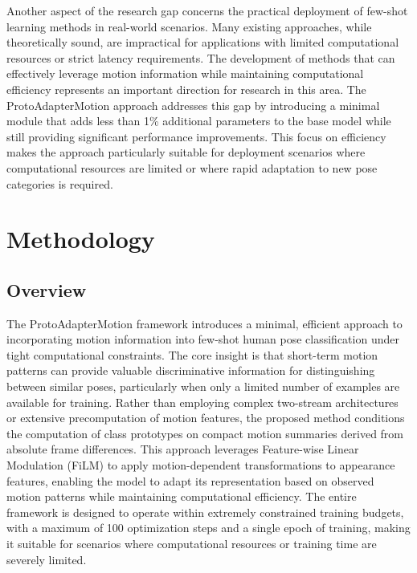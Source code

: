 \documentclass[11pt]{article}
\begin{document}
Another aspect of the research gap concerns the practical deployment of few-shot learning methods in real-world scenarios. Many existing approaches, while theoretically sound, are impractical for applications with limited computational resources or strict latency requirements. The development of methods that can effectively leverage motion information while maintaining computational efficiency represents an important direction for research in this area. The ProtoAdapterMotion approach addresses this gap by introducing a minimal module that adds less than 1\% additional parameters to the base model while still providing significant performance improvements. This focus on efficiency makes the approach particularly suitable for deployment scenarios where computational resources are limited or where rapid adaptation to new pose categories is required.

\section{Methodology}

\subsection{Overview}

The ProtoAdapterMotion framework introduces a minimal, efficient approach to incorporating motion information into few-shot human pose classification under tight computational constraints. The core insight is that short-term motion patterns can provide valuable discriminative information for distinguishing between similar poses, particularly when only a limited number of examples are available for training. Rather than employing complex two-stream architectures or extensive precomputation of motion features, the proposed method conditions the computation of class prototypes on compact motion summaries derived from absolute frame differences. This approach leverages Feature-wise Linear Modulation (FiLM) to apply motion-dependent transformations to appearance features, enabling the model to adapt its representation based on observed motion patterns while maintaining computational efficiency. The entire framework is designed to operate within extremely constrained training budgets, with a maximum of 100 optimization steps and a single epoch of training, making it suitable for scenarios where computational resources or training time are severely limited.
\end{document}
